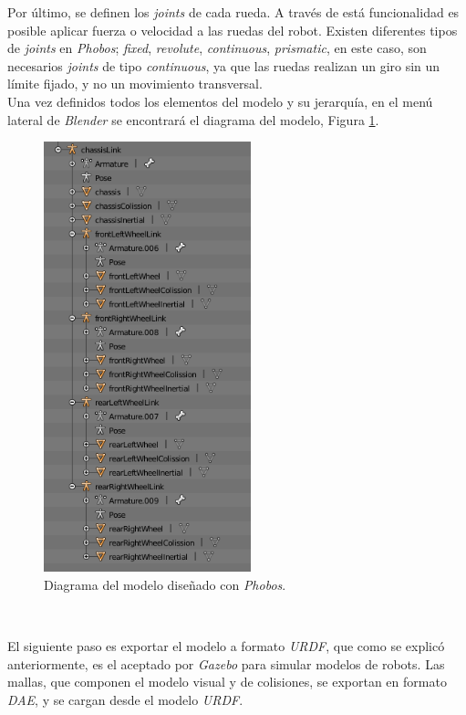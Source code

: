 Por último, se definen los \textit{joints} de cada rueda. A través de está funcionalidad es posible aplicar fuerza o velocidad a las ruedas del robot. Existen diferentes tipos de
\textit{joints} en \textit{Phobos}; \textit{fixed}, \textit{revolute}, \textit{continuous}, \textit{prismatic}, en este caso, son necesarios \textit{joints} de tipo
\textit{continuous}, ya que las ruedas realizan un giro sin un límite fijado, y no un movimiento transversal.\\

Una vez definidos todos los elementos del modelo y su jerarquía, en el menú lateral de \textit{Blender} se encontrará el diagrama del modelo, Figura \ref{fig:blenderdiagram}.\\

\begin{figure} [h!]
	\begin{center}
		\includegraphics[width=6cm]{figs/phobosDiagram}
	\end{center}
	\caption{Diagrama del modelo diseñado con \textit{Phobos}.}
	\label{fig:blenderdiagram}
\end{figure}\

El siguiente paso es exportar el modelo a formato \textit{URDF}, que como se explicó anteriormente, es el aceptado por \textit{Gazebo} para simular modelos de robots. Las mallas,
que componen el modelo visual y de colisiones, se exportan en formato \textit{DAE}, y se cargan desde el modelo \textit{URDF}.\\

